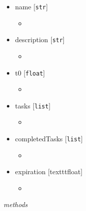 \documentclass{article}
\begin{document}
\begin{itemize}
    \item{name [\texttt{str}]
        \begin{itemize}
            \item{}
        \end{itemize}
         }
    \item{description [\texttt{str}]
        \begin{itemize}
            \item{}
        \end{itemize}
         }
    \item{t0 [\texttt{float}]
        \begin{itemize}
            \item{}
        \end{itemize}
         }
    \item{tasks [\texttt{list}]
        \begin{itemize}
            \item{}
        \end{itemize}
         }
    \item{completedTasks [\texttt{list}]
        \begin{itemize}
            \item{}
        \end{itemize}
         }
    \item{expiration [texttt{float}]
        \begin{itemize}
            \item{}
        \end{itemize}
         }
\end{itemize}

\noindent
\textit{methods}
\end{document}
